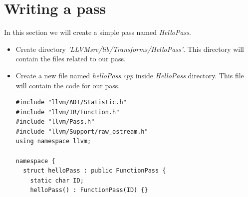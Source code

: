 \section{Writing a pass}
In this section we will create a simple pass named \textit{HelloPass}.
\begin{itemize}
    \item Create directory \textit{'LLVMsrc/lib/Transforms/HelloPass'}. This directory will contain the files related to our pass.
    \item Create a new file named \textit{helloPass.cpp} inside \textit{HelloPass} directory. This file will contain the code for our pass.
        \begin{lstlisting}
#include "llvm/ADT/Statistic.h"
#include "llvm/IR/Function.h"
#include "llvm/Pass.h"
#include "llvm/Support/raw_ostream.h"
using namespace llvm;

namespace {
  struct helloPass : public FunctionPass {
    static char ID;
    helloPass() : FunctionPass(ID) {}


\end{lstlisting}
\end{itemize}
